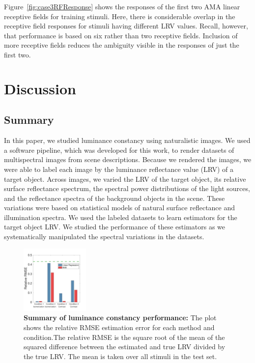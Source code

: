 \documentclass{jov}
\begin{document}
Figure~\ref{fig:case3RFResponse} shows the responses of the first two AMA linear receptive fields for training stimuli.
Here, there is considerable overlap in the receptive field responses for stimuli having different LRV values.
Recall, however, that performance is based on six rather than two receptive fields.
Inclusion of more receptive fields reduces the ambiguity visible in the responses of just the first two.

\section{Discussion} \label{Discussion}

\subsection{Summary}

In this paper, we studied luminance constancy using naturalistic images.
We used a software pipeline, which was developed for this work, to render datasets of multispectral images from scene descriptions.
Because we rendered the images, we were able to label each image by the luminance reflectance value (LRV) of a target object.
Across images, we varied the LRV of the target object, its relative surface reflectance spectrum, 
the spectral power distributions of the light sources, and the reflectance spectra of the background objects in the scene.
These variations were based on statistical models of natural surface reflectance and illumination spectra.
We used the labeled datasets to learn estimators for the target object LRV.
We studied the performance of these estimators as we systematically manipulated the 
spectral variations in the datasets.

\begin{figure}
\centering
\includegraphics[width=0.3\textwidth]{../FiguresDraft4/Figure13/Figure13_a.pdf}
\caption{{\bf Summary of luminance constancy performance:} The plot shows the relative RMSE estimation error for each method and condition.The relative RMSE is the square root of the mean of the squared difference between the estimated and true LRV divided by the true LRV. The mean is taken over all stimuli in the test set.}
 \label{fig:barGraphs}
\end{figure}
\end{document}
